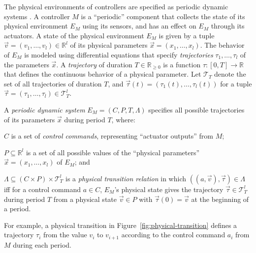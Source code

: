 \documentclass{sig-alternate}
\begin{document}
The physical environments of controllers
are specified as periodic dynamic systems \cite{ftscs-journal}.
%
A controller $M$ is a ``periodic'' component 
that collects the state of  its physical environment  $E_M$ using its sensors,
 and has an effect on $E_M$ through its  actuators.
A state of the physical environment $E_M$ 
is given by a tuple $\vec{v} = (v_1,\ldots,v_l) \in \mathbb{R}^l$ 
of its physical parameters $\vec{x} = (x_1, \ldots,x_l)$.
The behavior of $E_M$
is modeled using differential equations that specify \emph{trajectories} 
$\tau_1, \ldots, \tau_l$ of the parameters $\vec{x}$.
A \emph{trajectory} \cite{lynch2003hybrid} of duration $T \in \mathbb{R}_{\geq 0}$ is a function $\tau : [0,T] \rightarrow \mathbb{R}$
that defines the 
continuous behavior of a physical parameter.
%
Let  $\mathcal{T}_T$ denote
the set of all trajectories of 
duration $T$,
and $\vec{\tau}(t) = (\tau_1(t),\ldots,\tau_l(t))$ for a tuple %
$\vec{\tau} = (\tau_1,\ldots,\tau_l) \in \mathcal{T}_T^l$.

A \emph{periodic dynamic system} $E_M = (C, P, T, \Lambda)$ 
specifies all possible trajectories of its parameters $\vec{x}$
during period $T$, %
where:
 \begin{inparaenum}[(i)]
	\item $C$ is a set of \emph{control commands}, representing
          ``actuator outputs'' from %
          $M$;
	\item $P \subseteq \mathbb{R}^l$ is a set of all possible values 
          of the ``physical 
          parameters'' $\vec{x} = (x_1, \ldots, x_l)$ 
          of  $E_M$; and
	\item $\Lambda \subseteq (C \times P) \times \mathcal{T}_{T}^l$
	is a \emph{physical transition relation} in which
	$((a, \vec{v}),  \vec{\tau}) \in \Lambda$
	 iff for a control command $a \in C$, %
	$E_M$'s physical state gives the trajectory 
	$\vec{\tau} \in \mathcal{T}_{T}^l$ during period $T$
	from a physical state $\vec{v} \in P$
	with $\vec{\tau}(0) = \vec{v}$ at the beginning of a period.
\end{inparaenum}
%
For example,
a physical transition in Figure~\ref{fig:physical-transition} 
defines a trajectory $\tau_i$
from the value $v_i$ to $v_{i+1}$
 according to the control command $a_i$ 
from $M$ during each period.
\end{document}
